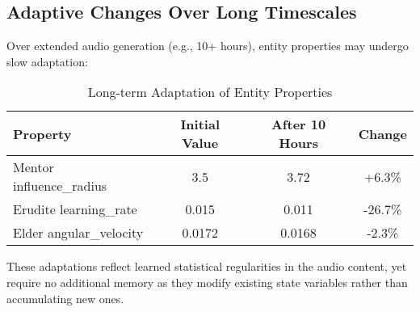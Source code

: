 \subsection{Adaptive Changes Over Long Timescales}

Over extended audio generation (e.g., 10+ hours), entity properties may undergo slow adaptation:

\begin{table}[h]
\centering
\begin{tabular}{|l|c|c|c|}
\hline
\textbf{Property} & \textbf{Initial Value} & \textbf{After 10 Hours} & \textbf{Change} \\
\hline
Mentor influence\_radius & 3.5 & 3.72 & +6.3\% \\
Erudite learning\_rate & 0.015 & 0.011 & -26.7\% \\
Elder angular\_velocity & 0.0172 & 0.0168 & -2.3\% \\
\hline
\end{tabular}
\caption{Long-term Adaptation of Entity Properties}
\end{table}

These adaptations reflect learned statistical regularities in the audio content, yet require no additional memory as they modify existing state variables rather than accumulating new ones.